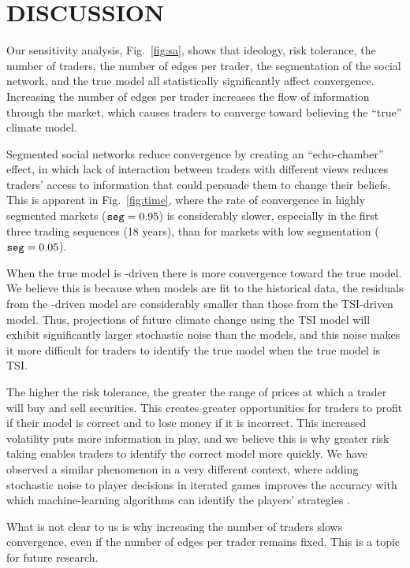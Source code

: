 \documentclass{article}\usepackage[]{graphicx}\usepackage[]{color}
\begin{document}
\section{DISCUSSION}

Our sensitivity analysis, Fig.~\ref{fig:sa}, shows that ideology, risk tolerance, the number of traders, the number of edges per trader, the segmentation of the social network, and the true model all statistically significantly affect convergence.  Increasing the number of edges per trader increases the flow of information through the market, which causes traders to converge toward believing the ``true'' climate model.

Segmented social networks reduce convergence by creating an ``echo-chamber'' effect, in which lack of interaction between traders with different views reduces traders' access to information that could persuade them to change their beliefs. This is apparent in Fig.~\ref{fig:time}, where the rate of convergence in highly segmented markets ($\text{\texttt{seg}} = 0.95$) is considerably slower, especially in the first three trading sequences (18 years), than for markets with low segmentation ($\text{\texttt{seg}} = 0.05$).

When the true model is -driven there is more convergence toward the true model. We believe this is because when models are fit to the historical data, the residuals from the -driven model are considerably smaller than those from the TSI-driven model. Thus, projections of future climate change using the TSI model will exhibit significantly larger stochastic noise than the  models, and this noise makes it more difficult for traders to identify the true model when the true model is TSI.

The higher the risk tolerance, the greater the range of prices at which a trader will buy and sell securities. This creates greater opportunities for traders to profit if their model is correct and to lose money if it is incorrect. This increased volatility puts more information in play, and we believe this is why greater risk taking enables traders to identify the correct model more quickly. We have observed a similar phenomenon in a very different context, where adding stochastic noise to player decisions in iterated games improves the accuracy with which machine-learning algorithms can identify the players' strategies .

What is not clear to us is why increasing the number of traders slows convergence, even if the number of edges per trader remains fixed. This is a topic for future research.
\end{document}
